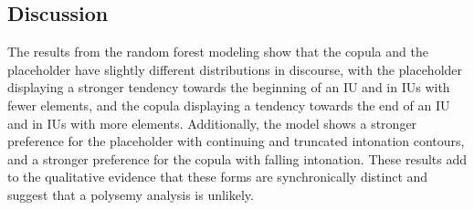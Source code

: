 \documentclass[output=paper,colorlinks,citecolor=brown
\ChapterDOI{10.5281/zenodo.15697581}
]{langscibook}
\begin{document}


\subsection{Discussion} \label{sec_discussion}

The results from the random forest modeling show that the copula and the placeholder have slightly different distributions in discourse, with the placeholder displaying a stronger tendency towards the beginning of an IU and in IUs with fewer elements, and the copula displaying a tendency towards the end of an IU and in IUs with more elements.  
Additionally, the model shows a stronger preference for the placeholder with continuing and truncated intonation contours, and a stronger preference for the copula with falling intonation.
These results add to the qualitative evidence that these forms are synchronically distinct and suggest that a polysemy analysis is unlikely. 

\end{document}
